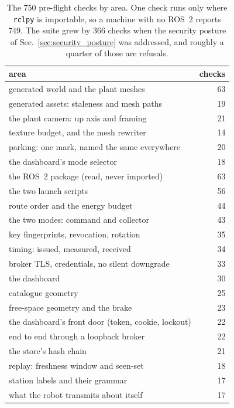 \begin{table}[!t]
\caption{The 750 pre-flight checks by area. One check runs only where
\texttt{rclpy} is importable, so a machine with no ROS~2 reports 749.
The suite grew by 366 checks when the security posture of
Sec.~\ref{sec:security_posture} was addressed, and roughly a quarter of
those are refusals.}
\label{tab:checks}
\centering\footnotesize
\begin{tabular}{@{}p{}r@{}}
\toprule
area & checks \\
\midrule
generated world and the plant meshes          &  63 \\
generated assets: staleness and mesh paths    &  19 \\
the plant camera: up axis and framing         &  21 \\
texture budget, and the mesh rewriter          &  14 \\
parking: one mark, named the same everywhere   &  20 \\
the dashboard's mode selector                  &  18 \\
the ROS~2 package (read, never imported)      &  63 \\
the two launch scripts                        &  56 \\
route order and the energy budget             &  44 \\
the two modes: command and collector          &  43 \\
key fingerprints, revocation, rotation        &  35 \\
timing: issued, measured, received            &  34 \\
broker TLS, credentials, no silent downgrade  &  33 \\
the dashboard                                 &  30 \\
catalogue geometry                            &  25 \\
free-space geometry and the brake             &  23 \\
the dashboard's front door (token, cookie, lockout) &  22 \\
end to end through a loopback broker          &  22 \\
the store's hash chain                        &  21 \\
replay: freshness window and seen-set         &  18 \\
station labels and their grammar              &  17 \\
what the robot transmits about itself         &  17 \\

\end{tabular}
\end{table}
